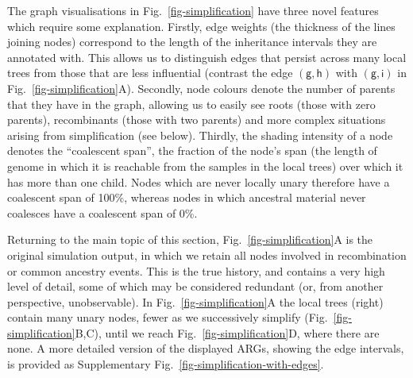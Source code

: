 \documentclass{article}
\newcommand{\noderef}[1]{\textsf{#1}}
\begin{document}
The graph visualisations in Fig.~\ref{fig-simplification} have
three novel features which require some explanation.
Firstly, edge weights (the thickness of the lines joining
nodes) correspond to the length of the inheritance intervals
they are annotated with. This allows us to distinguish
edges that persist across many local trees from those that are
less influential (contrast the edge
$(\noderef{g}, \noderef{h})$
with $(\noderef{g}, \noderef{i})$
in Fig.~\ref{fig-simplification}A).
Secondly, node colours denote the number of parents that they
have in the graph, allowing us to easily see roots (those
with zero parents), recombinants (those with two parents)
and more complex situations arising from simplification (see below).
Thirdly, the shading intensity of a node denotes the ``coalescent span'', the
fraction of the node's span (the length of genome in which it
is reachable from the samples in the local trees)
over which it has more than one child. Nodes which
are never locally unary therefore have a coalescent span of 100\%,
whereas nodes in which ancestral material never coalesces have a
coalescent span of 0\%.

Returning to the main topic of this section,
Fig.~\ref{fig-simplification}A is the original simulation output, in
which we retain all nodes involved in recombination
or common ancestry events. This is the true history, and contains
a very high level of detail, some of which may be considered
redundant (or, from another perspective, unobservable).
In Fig.~\ref{fig-simplification}A the local trees (right)
contain many unary nodes, fewer as  we successively
simplify (Fig.~\ref{fig-simplification}B,C),
until we reach Fig.~\ref{fig-simplification}D, where there are none.
A more detailed version of the displayed ARGs, showing the edge
intervals, is provided as Supplementary Fig.~\ref{fig-simplification-with-edges}.
\end{document}
